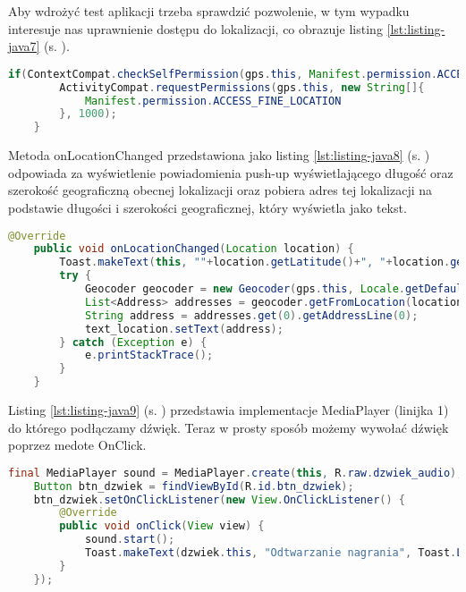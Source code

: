 Aby wdrożyć test aplikacji trzeba sprawdzić pozwolenie, w tym wypadku interesuje nas uprawnienie dostępu do lokalizacji, co obrazuje listing  \ref{lst:listing-java7} (s. \pageref{lst:listing-java7}). 
\begin{lstlisting}[caption=GPS - Dostęp do lokazlizacji, label={lst:listing-java7}, language=Java]
	if(ContextCompat.checkSelfPermission(gps.this, Manifest.permission.ACCESS_FINE_LOCATION) != PackageManager.PERMISSION_GRANTED) {
		ActivityCompat.requestPermissions(gps.this, new String[]{
			Manifest.permission.ACCESS_FINE_LOCATION
		}, 1000);
	}
\end{lstlisting}

\newpage


Metoda onLocationChanged przedstawiona jako listing \ref{lst:listing-java8} (s. \pageref{lst:listing-java8}) odpowiada za wyświetlenie powiadomienia push-up wyświetlającego długość oraz szerokość geograficzną obecnej lokalizacji oraz pobiera adres tej lokalizacji na podstawie długości i szerokości geograficznej, który wyświetla jako tekst.
\begin{lstlisting}[caption=GPS - Wyświetlanie lokalizacji, label={lst:listing-java8}, language=Java]
	@Override
	public void onLocationChanged(Location location) {
		Toast.makeText(this, ""+location.getLatitude()+", "+location.getLongitude(), Toast.LENGTH_SHORT).show();
		try {
			Geocoder geocoder = new Geocoder(gps.this, Locale.getDefault());
			List<Address> addresses = geocoder.getFromLocation(location.getLatitude(), location.getLongitude(), 1);
			String address = addresses.get(0).getAddressLine(0);
			text_location.setText(address);
		} catch (Exception e) {
			e.printStackTrace();
		}
	}
\end{lstlisting}


Listing \ref{lst:listing-java9} (s. \pageref{lst:listing-java9}) przedstawia implementacje MediaPlayer (linijka 1) do którego podłączamy dźwięk. Teraz w prosty sposób możemy wywołać dźwięk poprzez medote OnClick.
\begin{lstlisting}[caption= Dźwięk - Działanie z wykorzystaniem MediaPlayer, label={lst:listing-java9}, language=Java]
	final MediaPlayer sound = MediaPlayer.create(this, R.raw.dzwiek_audio);
	Button btn_dzwiek = findViewById(R.id.btn_dzwiek);
	btn_dzwiek.setOnClickListener(new View.OnClickListener() {
		@Override
		public void onClick(View view) {
			sound.start();
			Toast.makeText(dzwiek.this, "Odtwarzanie nagrania", Toast.LENGTH_SHORT).show();
		}
	});
\end{lstlisting}

